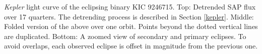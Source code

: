 \label{fig:keplerfig} \emph{Kepler} light curve of the eclipsing binary KIC 9246715. Top: Detrended SAP flux over 17 quarters. The detrending process is described in Section \ref{kepler}. Middle: Folded version of the above over one orbit. Points beyond the dotted vertical lines are duplicated. Bottom: A zoomed view of secondary and primary eclipses. To avoid overlaps, each observed eclipse is offset in magnitude from the previous one.